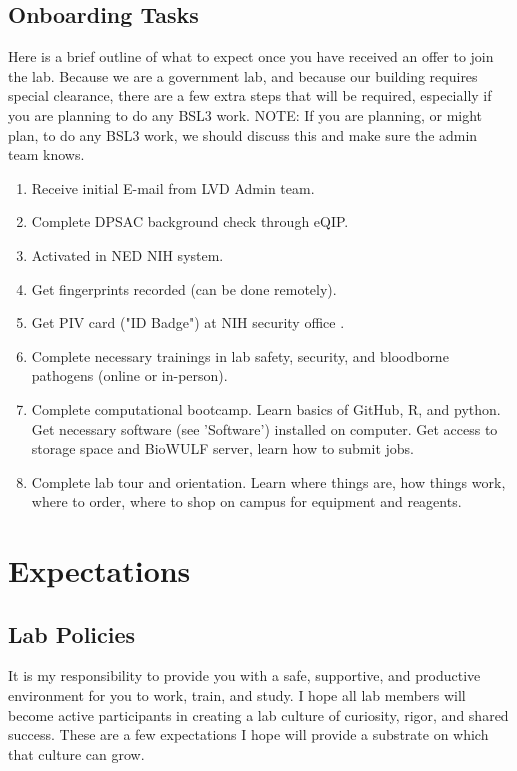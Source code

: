 \documentclass[10pt, a4paper, twocolumn]{article} %
\begin{document}
\subsection{Onboarding Tasks}
Here is a brief outline of what to expect once you have received an offer to join the lab. Because we are a government lab, and because our building requires special clearance, there are a few extra steps that will be required, especially if you are planning to do any BSL3 work.
NOTE: If you are planning, or might plan, to do any BSL3 work, we should discuss this and make sure the admin team knows.
\begin{enumerate}
\item Receive initial E-mail from LVD Admin team.
\item Complete DPSAC background check through eQIP.
\item Activated in NED NIH system.
\item Get fingerprints recorded (can be done remotely).
\item Get PIV card ("ID Badge") at NIH security office .
\item Complete necessary trainings in lab safety, security, and bloodborne pathogens (online or in-person).
\item Complete computational bootcamp. Learn basics of GitHub, R, and python. Get necessary software (see 'Software') installed on computer. Get access to storage space and BioWULF server, learn how to submit jobs.
\item Complete lab tour and orientation.	Learn where things are, how things work, where to order, where to shop on campus for equipment and reagents.
\end{enumerate}

\section{Expectations}
\subsection{Lab Policies}
It is my responsibility to provide you with a safe, supportive, and productive environment for you to work, train, and study. I hope all lab members will become active participants in creating a lab culture of curiosity, rigor, and shared success. These are a few expectations I hope will provide a substrate on which that culture can grow.
\end{document}
